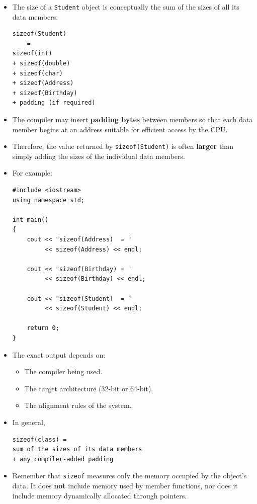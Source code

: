 \documentclass[10pt]{article}
\begin{document}
\begin{itemize}
\begin{verbatim}
class Birthday
{
public:
    int day;
    int month;
    int year;
};

class Student
{
private:
    int id;             // Fundamental type
    double gpa;         // Fundamental type
    char grade;         // Fundamental type

    Address address;    // Structure
    Birthday birth;     // Another class
};
\end{verbatim}

    \item The size of a \verb|Student| object is conceptually the sum of the sizes
    of all its data members:

\begin{verbatim}
sizeof(Student)
    =
sizeof(int)
+ sizeof(double)
+ sizeof(char)
+ sizeof(Address)
+ sizeof(Birthday)
+ padding (if required)
\end{verbatim}

    \item The compiler may insert \textbf{padding bytes} between members so that
    each data member begins at an address suitable for efficient access by the CPU.

    \item Therefore, the value returned by \verb|sizeof(Student)| is often
    \textbf{larger} than simply adding the sizes of the individual data members.

    \item For example:

\begin{verbatim}
#include <iostream>
using namespace std;

int main()
{
    cout << "sizeof(Address)  = "
         << sizeof(Address) << endl;

    cout << "sizeof(Birthday) = "
         << sizeof(Birthday) << endl;

    cout << "sizeof(Student)  = "
         << sizeof(Student) << endl;

    return 0;
}
\end{verbatim}

    \item The exact output depends on:
    \begin{itemize}
        \item The compiler being used.
        \item The target architecture (32-bit or 64-bit).
        \item The alignment rules of the system.
    \end{itemize}

    \item In general,

\begin{verbatim}
sizeof(class) =
sum of the sizes of its data members
+ any compiler-added padding
\end{verbatim}

    \item Remember that \verb|sizeof| measures only the memory occupied by the
    object's data. It does \textbf{not} include memory used by member functions,
    nor does it include memory dynamically allocated through pointers.
\end{itemize}
\end{document}
